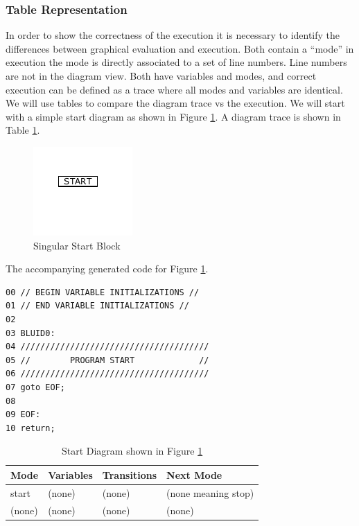 \subsubsection{Table Representation}

In order to show the correctness of the execution it is necessary to identify the differences 
between graphical evaluation and execution. Both contain a ``mode'' in execution the 
mode is directly associated to a set of line numbers. Line numbers are not in the diagram view. 
Both have variables and modes, and correct execution can be defined as a trace where all 
modes and variables are identical. We will use tables to compare the diagram trace vs the execution.
We will start with a simple start diagram as shown in Figure \ref{fig:correctness_ex_start}.
A diagram trace is shown in Table \ref{table:BasicDiagOnly}. 

\begin{figure}[h]
	\centering
	\includegraphics[width=\imgsmall]{./images/correctness_ex_start.png}
	\caption{Singular Start Block}
	\label{fig:correctness_ex_start}
\end{figure}


The accompanying generated  code for Figure \ref{fig:correctness_ex_start}.

\begin{lstlisting}[frame=single]
00 // BEGIN VARIABLE INITIALIZATIONS //
01 // END VARIABLE INITIALIZATIONS //
02
03 BLUID0:
04 //////////////////////////////////////
05 //        PROGRAM START             //
06 //////////////////////////////////////
07 goto EOF;
08 
09 EOF:
10 return;
\end{lstlisting}

\begin{table}[htcb]
	\caption{Start Diagram shown in Figure \ref{fig:correctness_ex_start}}
	\centering
		\begin{tabular}{| l | l | l | l |}
			\hline
			\textbf{Mode} & \textbf{Variables} & \textbf{Transitions} & \textbf{Next Mode} \\
			\hline
			start & (none) & (none) & (none meaning stop) \\
			\hline
			(none) & (none) & (none) & (none) \\
			\hline
		\end{tabular}
	\label{table:BasicDiagOnly}
\end{table}

